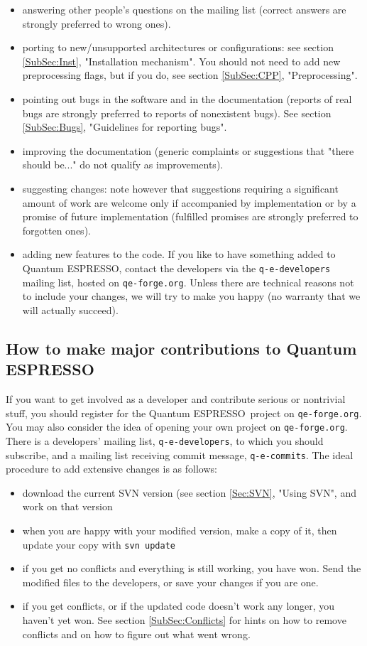 \documentclass[12pt,a4paper]{article}
\def\qe{{\sc Quantum ESPRESSO}}
\def\qeforge{\texttt{qe-forge.org}}
\begin{document}
\begin{itemize}
\item answering other people's questions on the mailing list (correct
  answers are strongly preferred to wrong ones). 
\item porting to new/unsupported architectures or configurations: see
  section \ref{SubSec:Inst}, "Installation mechanism". You should
  not need to add new preprocessing flags, but if you do, 
  see section \ref{SubSec:CPP}, "Preprocessing".
\item pointing out bugs in the software and in the documentation
  (reports of real bugs are strongly preferred to reports of
  nonexistent bugs). See section \ref{SubSec:Bugs}, "Guidelines 
  for reporting bugs".
\item improving the documentation (generic complaints or suggestions
  that "there should be..." do not qualify as improvements). 
\item  suggesting changes: note however that suggestions requiring a
  significant amount of work are welcome only if accompanied by
  implementation or by a promise of future implementation (fulfilled
  promises are strongly preferred to forgotten ones). 
\item adding new features to the code. If you like to have something
  added to \qe, contact the developers via the
 \texttt{q-e-developers} mailing list, hosted on \qeforge.
 Unless there are technical reasons not to include your changes, we 
 will try to make you happy (no warranty that we will actually succeed).
\end{itemize}

\subsection{How to make major contributions to \qe}
If you want to get involved as a developer and contribute serious
or nontrivial stuff, you should register for the \qe\ project on 
\qeforge. You may also consider the idea of opening
your own project on \qeforge. There is a developers' 
mailing list, \texttt{q-e-developers}, to which you should subscribe,
and a mailing list receiving commit message, \texttt{q-e-commits}.
The ideal procedure to add extensive changes is as follows:
\begin{itemize}
\item download the current SVN version (see 
section \ref{Sec:SVN}, "Using SVN", and work on that version
\item when you are happy with your modified version, make a copy of
  it, then update your copy with \texttt{svn update} 
\item if you get no conflicts and everything is still working, you
  have won. Send the modified files to the developers, or save
  your changes if you are one.
\item if you get conflicts, or if the updated code doesn't work any
  longer, you haven't yet won. See section
  \ref{SubSec:Conflicts} for hints on how to 
  remove conflicts and on how to figure out
   what went wrong.
\end{itemize}
\end{document}
